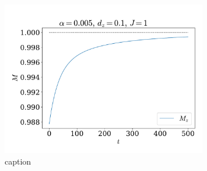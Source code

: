 \documentclass{article}
\begin{document}
    \begin{figure}
        \centering
        \includegraphics[width=0.8\textwidth]{../plots/mag.pdf}
        \caption{caption}
        \label{mag}
    \end{figure}

    
    
\end{document}
